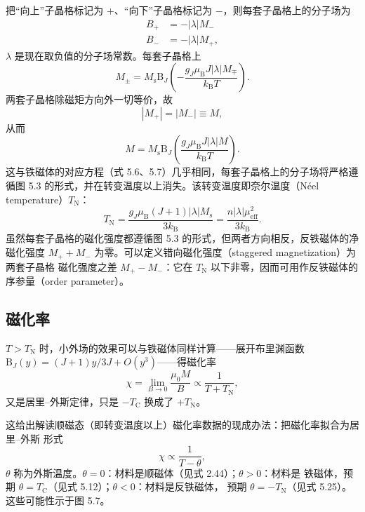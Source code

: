 把“向上”子晶格标记为 +、“向下”子晶格标记为 $-$，则每套子晶格上的分子场为
\begin{equation*}
\begin{aligned}
B_{+} &= -|\lambda|M_{-}\\
B_{-} &= -|\lambda|M_{+},
\end{aligned}\tag{5.20}
\end{equation*}
$\lambda$ 是现在取负值的分子场常数。每套子晶格上
\begin{equation*}
M_{\pm} = M_{\mathrm{s}}\mathrm{B}_J\left(-\frac{g_J\mu_{\mathrm{B}}J|\lambda|M_{\mp}}{k_{\mathrm{B}}T}\right).\tag{5.21}
\end{equation*}
两套子晶格除磁矩方向外一切等价，故
\begin{equation*}
|M_{+}| = |M_{-}| \equiv M,\tag{5.22}
\end{equation*}
从而
\begin{equation*}
M = M_{\mathrm{s}}\mathrm{B}_J\left(\frac{g_J\mu_{\mathrm{B}}J|\lambda|M}{k_{\mathrm{B}}T}\right).\tag{5.23}
\end{equation*}
这与铁磁体的对应方程（式 5.6、5.7）几乎相同，每套子晶格上的分子场将严格遵循图 5.3
的形式，并在转变温度以上消失。该转变温度即奈尔温度（Néel temperature）$T_{\mathrm{N}}$：
\begin{equation*}
T_{\mathrm{N}} = \frac{g_J\mu_{\mathrm{B}}(J+1)|\lambda|M_{\mathrm{s}}}{3k_{\mathrm{B}}} = \frac{n|\lambda|\mu_{\mathrm{eff}}^{2}}{3k_{\mathrm{B}}}.\tag{5.24}
\end{equation*}
虽然每套子晶格的磁化强度都遵循图 5.3 的形式，但两者方向相反，反铁磁体的净磁化强度
$M_{+}+M_{-}$ 为零。可以定义错向磁化强度（staggered magnetization）为两套子晶格
磁化强度之差 $M_{+}-M_{-}$：它在 $T_{\mathrm{N}}$ 以下非零，因而可用作反铁磁体的
序参量（order parameter）。

\subsection{磁化率}

$T>T_{\mathrm{N}}$ 时，小外场的效果可以与铁磁体同样计算——展开布里渊函数
$\mathrm{B}_J(y)=(J+1)y/3J+O(y^{3})$——得磁化率
\begin{equation*}
\chi = \lim_{B\to0}\frac{\mu_0M}{B} \propto \frac{1}{T+T_{\mathrm{N}}},\tag{5.25}
\end{equation*}
又是居里--外斯定律，只是 $-T_{\mathrm{C}}$ 换成了 $+T_{\mathrm{N}}$。

这给出解读顺磁态（即转变温度以上）磁化率数据的现成办法：把磁化率拟合为居里--外斯
形式
\begin{equation*}
\chi \propto \frac{1}{T-\theta},\tag{5.26}
\end{equation*}
$\theta$ 称为外斯温度。$\theta=0$：材料是顺磁体（见式 2.44）；$\theta>0$：材料是
铁磁体，预期 $\theta=T_{\mathrm{C}}$（见式 5.12）；$\theta<0$：材料是反铁磁体，
预期 $\theta=-T_{\mathrm{N}}$（见式 5.25）。这些可能性示于图 5.7。

